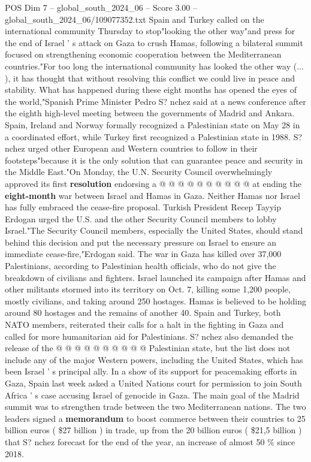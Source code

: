 \begin{textsample}{POS Dim 7 – global\_south\_2024\_06 – Score 3.00 – global\_south\_2024\_06/109077352.txt}  \label{ex:f7_pos_082}
Spain and Turkey called on the international community Thursday to stop"looking the other way"and press for the end of Israel ' s attack on Gaza to crush Hamas, following a bilateral summit focused on strengthening economic cooperation between the Mediterranean countries."For too long the international community has looked the other way (... ), it has thought that without resolving this conflict we could live in peace and stability.
What has happened during these eight months has opened the eyes of the world,"Spanish Prime Minister Pedro S? nchez said at a news conference after the eighth high-level meeting between the governments of Madrid and Ankara.
Spain, Ireland and Norway formally recognized a Palestinian state on May 28 in a coordinated effort, while Turkey first recognized a Palestinian state in 1988.
S? nchez urged other European and Western countries to follow in their footsteps"because it is the only solution that can guarantee peace and security in the Middle East."On Monday, the U.N.
Security Council overwhelmingly approved its first \textbf{resolution} endorsing a @ @ @ @ @ @ @ @ @ @ at ending the \textbf{eight-month} war between Israel and Hamas in Gaza.
Neither Hamas nor Israel has fully embraced the cease-fire proposal.
Turkish President Recep Tayyip Erdogan urged the U.S. and the other Security Council members to lobby Israel."The Security Council members, especially the United States, should stand behind this decision and put the necessary pressure on Israel to ensure an immediate cease-fire,"Erdogan said.
The war in Gaza has killed over 37,000 Palestinians, according to Palestinian health officials, who do not give the breakdown of civilians and fighters.
Israel launched its campaign after Hamas and other militants stormed into its territory on Oct. 7, killing some 1,200 people, mostly civilians, and taking around 250 hostages.
Hamas is believed to be holding around 80 hostages and the remains of another 40.
Spain and Turkey, both NATO members, reiterated their calls for a halt in the fighting in Gaza and called for more humanitarian aid for Palestinians.
S? nchez also demanded the release of the @ @ @ @ @ @ @ @ @ @ Palestinian state, but the list does not include any of the major Western powers, including the United States, which has been Israel ' s principal ally.
In a show of its support for peacemaking efforts in Gaza, Spain last week asked a United Nations court for permission to join South Africa ' s case accusing Israel of genocide in Gaza.
The main goal of the Madrid summit was to strengthen trade between the two Mediterranean nations.
The two leaders signed a \textbf{memorandum} to boost commerce between their countries to 25 billion euros ( \$27 billion ) in trade, up from the 20 billion euros ( \$21,5 billion ) that S? nchez forecast for the end of the year, an increase of almost 50 \% since 2018.

\end{textsample}
